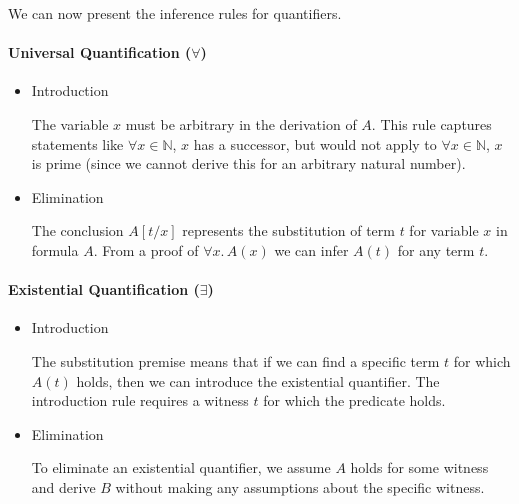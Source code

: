 We can now present the inference rules for quantifiers.
\paragraph{Universal Quantification ($\forall$)}
\begin{itemize}
    \item Introduction
    \begin{prooftree}
    \end{prooftree}
    The variable $x$ must be arbitrary in the derivation of $A$. 
    This rule captures statements like 
    $\forall x \in \mathbb{N}$, $x$ has a successor, 
    but would not apply to $\forall x \in \mathbb{N}$, $x$ is prime 
    (since we cannot derive this for an arbitrary natural number).
    
    \item Elimination
    \begin{prooftree}
    \end{prooftree}
    The conclusion $A[t/x]$ represents the substitution of term $t$ for variable $x$ in formula $A$. 
    From a proof of $\forall x.\,A(x)$ we can infer $A(t)$ for any term $t$.
\end{itemize}

\paragraph{Existential Quantification ($\exists$)}
\begin{itemize}
    \item Introduction
    \begin{prooftree}
    \end{prooftree}
    The substitution premise means that if we can find a specific term $t$ for which $A(t)$ holds, 
    then we can introduce the existential quantifier. 
    The introduction rule requires a witness $t$ for which the predicate holds.
    
    \item Elimination
    \begin{prooftree}
    \end{prooftree}
    To eliminate an existential quantifier, we assume $A$ holds for some witness 
    and derive $B$ without making any assumptions about the specific witness.
\end{itemize}


